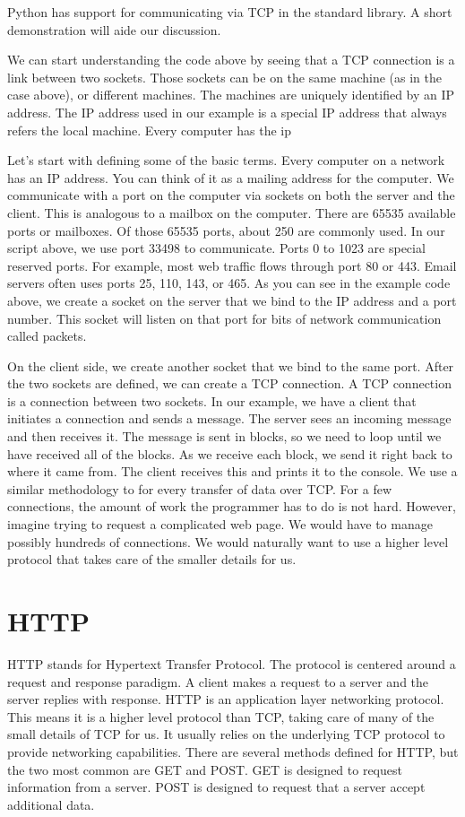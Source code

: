 Python has support for communicating via TCP in the standard library.
A short demonstration will aide our discussion.




We can start understanding the code above by seeing that a TCP connection is a link between two sockets.
Those sockets can be on the same machine (as in the case above), or different machines.
The machines are uniquely identified by an IP address.
The IP address used in our example is a special IP address that always refers the local machine.
Every computer has the ip


Let's start with defining some of the basic terms.
Every computer on a network has an IP address.
You can think of it as a mailing address for the computer.
We communicate with a port on the computer via sockets on both the server and the client.
This is analogous to a mailbox on the computer.
There are 65535 available ports or mailboxes.
Of those 65535 ports, about 250 are commonly used.
In our script above, we use port 33498 to communicate.
Ports 0 to 1023 are special reserved ports.
For example, most web traffic flows through port 80 or 443.
Email servers often uses ports 25, 110, 143, or 465.
As you can see in the example code above, we create a socket on the server that we bind to the IP address and a port number.
This socket will listen on that port for bits of network communication called packets.

On the client side, we create another socket that we bind to the same port.
After the two sockets are defined, we can create a TCP connection.
A TCP connection is a connection between two sockets.
In our example, we have a client that initiates a connection and sends a message.
The server sees an incoming message and then receives it.
The message is sent in blocks, so we need to loop until we have received all of the blocks.
As we receive each block, we send it right back to where it came from.
The client receives this and prints it to the console.
We use a similar methodology to for every transfer of data over TCP.
For a few connections, the amount of work the programmer has to do is not hard.
However, imagine trying to request a complicated web page.
We would have to manage possibly hundreds of connections.
We would naturally want to use a higher level protocol that takes care of the smaller details for us.

\section*{HTTP}
HTTP stands for Hypertext Transfer Protocol.
The protocol is centered around a request and response paradigm.
A client makes a request to a server and the server replies with response.
HTTP is an application layer networking protocol.
This means it is a higher level protocol than TCP, taking care of many of the small details of TCP for us.
It usually relies on the underlying TCP protocol to provide networking capabilities.
There are several methods defined for HTTP, but the two most common are GET and POST.
GET is designed to request information from a server.
POST is designed to request that a server accept additional data.

